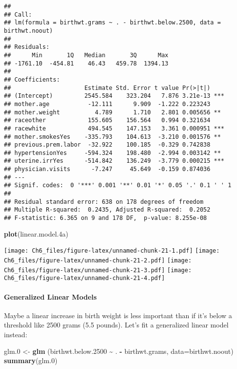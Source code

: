 \documentclass[
]{article}
\newenvironment{Shaded}{\begin{snugshade}}{\end{snugshade}}
\newcommand{\AttributeTok}[1]{\textcolor[rgb]{0.13,0.29,0.53}{#1}}
\newcommand{\FloatTok}[1]{\textcolor[rgb]{0.00,0.00,0.81}{#1}}
\newcommand{\FunctionTok}[1]{\textcolor[rgb]{0.13,0.29,0.53}{\textbf{#1}}}
\newcommand{\NormalTok}[1]{#1}
\newcommand{\OtherTok}[1]{\textcolor[rgb]{0.56,0.35,0.01}{#1}}
\newcommand{\SpecialCharTok}[1]{\textcolor[rgb]{0.81,0.36,0.00}{\textbf{#1}}}
\begin{document}
\begin{verbatim}
## 
## Call:
## lm(formula = birthwt.grams ~ . - birthwt.below.2500, data = birthwt.noout)
## 
## Residuals:
##      Min       1Q   Median       3Q      Max 
## -1761.10  -454.81    46.43   459.78  1394.13 
## 
## Coefficients:
##                     Estimate Std. Error t value Pr(>|t|)    
## (Intercept)         2545.584    323.204   7.876 3.21e-13 ***
## mother.age           -12.111      9.909  -1.222 0.223243    
## mother.weight          4.789      1.710   2.801 0.005656 ** 
## raceother            155.605    156.564   0.994 0.321634    
## racewhite            494.545    147.153   3.361 0.000951 ***
## mother.smokesYes    -335.793    104.613  -3.210 0.001576 ** 
## previous.prem.labor  -32.922    100.185  -0.329 0.742838    
## hypertensionYes     -594.324    198.480  -2.994 0.003142 ** 
## uterine.irrYes      -514.842    136.249  -3.779 0.000215 ***
## physician.visits      -7.247     45.649  -0.159 0.874036    
## ---
## Signif. codes:  0 '***' 0.001 '**' 0.01 '*' 0.05 '.' 0.1 ' ' 1
## 
## Residual standard error: 638 on 178 degrees of freedom
## Multiple R-squared:  0.2435, Adjusted R-squared:  0.2052 
## F-statistic: 6.365 on 9 and 178 DF,  p-value: 8.255e-08
\end{verbatim}

\begin{Shaded}
\begin{Highlighting}[]
\FunctionTok{plot}\NormalTok{(linear.model}\FloatTok{.4}\NormalTok{a)}
\end{Highlighting}
\end{Shaded}

\texttt{[image: Ch6\_files/figure-latex/unnamed-chunk-21-1.pdf]}
\texttt{[image: Ch6\_files/figure-latex/unnamed-chunk-21-2.pdf]}
\texttt{[image: Ch6\_files/figure-latex/unnamed-chunk-21-3.pdf]}
\texttt{[image: Ch6\_files/figure-latex/unnamed-chunk-21-4.pdf]}

\paragraph{Generalized Linear Models}\label{generalized-linear-models}

Maybe a linear increase in birth weight is less important than if it's
below a threshold like 2500 grams (5.5 pounds). Let's fit a generalized
linear model instead:

\begin{Shaded}
\begin{Highlighting}[]
\NormalTok{glm}\FloatTok{.0} \OtherTok{\textless{}{-}} \FunctionTok{glm}\NormalTok{ (birthwt.below}\FloatTok{.2500} \SpecialCharTok{\textasciitilde{}}\NormalTok{ . }\SpecialCharTok{{-}}\NormalTok{ birthwt.grams, }\AttributeTok{data=}\NormalTok{birthwt.noout)}
\FunctionTok{summary}\NormalTok{(glm}\FloatTok{.0}\NormalTok{)}
\end{Highlighting}
\end{Shaded}
\end{document}
